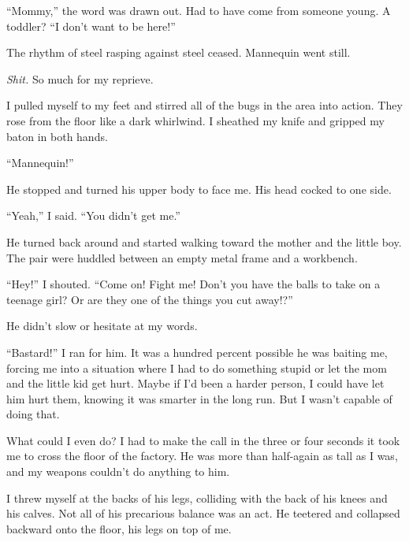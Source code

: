 ``Mommy,'' the word was drawn out.  Had to have come from someone young.  A toddler?  ``I don't want to be here!''



The rhythm of steel rasping against steel ceased.  Mannequin went still.



\emph{Shit.  }So much for my reprieve.



I pulled myself to my feet and stirred all of the bugs in the area into action.  They rose from the floor like a dark whirlwind.  I sheathed my knife and gripped my baton in both hands.



``Mannequin!''



He stopped and turned his upper body to face me.  His head cocked to one side.



``Yeah,'' I said.  ``You didn't get me.''



He turned back around and started walking toward the mother and the little boy.  The pair were huddled between an empty metal frame and a workbench.



``Hey!'' I shouted.  ``Come on!  Fight me!  Don't you have the balls to take on a teenage girl?  Or are they one of the things you cut away!?''



He didn't slow or hesitate at my words.



``Bastard!''  I ran for him.  It was a hundred percent possible he was baiting me, forcing me into a situation where I had to do something stupid or let the mom and the little kid get hurt.  Maybe if I'd been a harder person, I could have let him hurt them, knowing it was smarter in the long run.  But I wasn't capable of doing that.



What could I even do?  I had to make the call in the three or four seconds it took me to cross the floor of the factory.  He was more than half-again as tall as I was, and my weapons couldn't do anything to him.



I threw myself at the backs of his legs, colliding with the back of his knees and his calves.  Not all of his precarious balance was an act.  He teetered and collapsed backward onto the floor, his legs on top of me.



